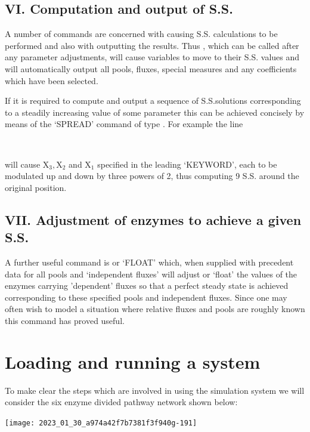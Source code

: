 \subsection*{VI. Computation and output of S.S.}

A number of commands are concerned with causing S.S. calculations to be performed and also with outputting the results. Thus , which can be called after any parameter adjustments, will cause variables to move to their S.S. values and will automatically output all pools, fluxes, special measures and any coefficients which have been selected.

If it is required to compute and output a sequence of S.S.solutions corresponding to a steadily increasing value of some parameter this can be achieved concisely by means of the `SPREAD' command of type . For example the line

{\tt {}    \textquotesingle}

will cause $\mathrm{X}_{3}, \mathrm{X}_{2}$ and $\mathrm{X}_{1}$ specified in the leading `KEYWORD', each to be modulated up and down by three powers of 2, thus computing 9 S.S. around the original position.

\subsection*{VII. Adjustment of enzymes to achieve a given S.S.}

A further useful command is  or `FLOAT' which, when supplied with precedent data for all pools and `independent fluxes' will adjust or `float' the values of the enzymes carrying 'dependent' fluxes so that a perfect steady state is achieved corresponding to these specified pools and independent fluxes. Since one may often wish to model a situation where relative fluxes and pools are roughly known this command has proved useful.

\section{Loading and running a system}

To make clear the steps which are involved in using the simulation system we will consider the six enzyme divided pathway network shown below:

\begin{center}
\texttt{[image: 2023\_01\_30\_a974a42f7b7381f3f940g-191]}
\end{center}

